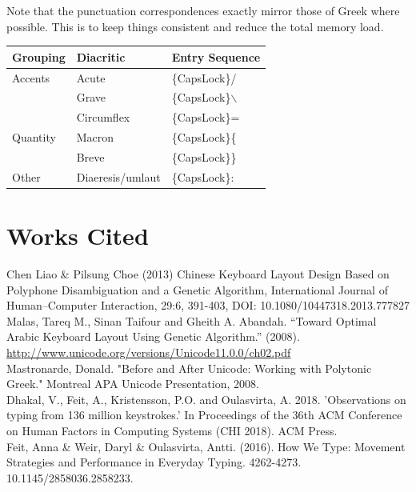 \documentclass[11pt]{article}
\begin{document}
Note that the punctuation correspondences exactly mirror those of Greek where possible. This is to keep things consistent and reduce the total memory load.

\begin{center}
\begin{tabular}{lll}
Grouping & Diacritic & Entry Sequence\\
\hline
Accents & Acute & \{CapsLock\}/\\
 & Grave & \{CapsLock\}$\backslash$\\
 & Circumflex & \{CapsLock\}=\\
Quantity & Macron & \{CapsLock\}\{\\
 & Breve & \{CapsLock\}\}\\
Other & Diaeresis/umlaut & \{CapsLock\}:\\
\end{tabular}
\end{center}

\section{Works Cited}
\label{sec:org6ef6dfb}

Chen Liao \& Pilsung Choe (2013) Chinese Keyboard Layout Design Based on Polyphone Disambiguation and a Genetic Algorithm, International Journal of Human–Computer Interaction, 29:6, 391-403, DOI: 10.1080/10447318.2013.777827 \\

Malas, Tareq M., Sinan Taifour and Gheith A. Abandah. “Toward Optimal Arabic Keyboard Layout Using Genetic Algorithm.” (2008). \\

\url{http://www.unicode.org/versions/Unicode11.0.0/ch02.pdf} \\

Mastronarde, Donald. "Before and After Unicode: Working with Polytonic Greek." Montreal APA Unicode Presentation, 2008. \\

Dhakal, V., Feit, A., Kristensson, P.O. and Oulasvirta, A. 2018. 'Observations on typing from 136 million keystrokes.' In Proceedings of the 36th ACM Conference on Human Factors in Computing Systems (CHI 2018). ACM Press. \\

Feit, Anna \& Weir, Daryl \& Oulasvirta, Antti. (2016). How We Type: Movement Strategies and Performance in Everyday Typing. 4262-4273. 10.1145/2858036.2858233. \\
\end{document}
